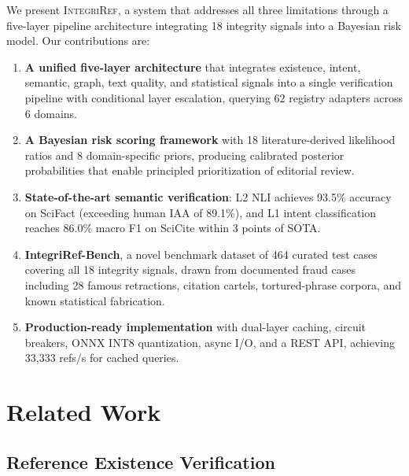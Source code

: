 \documentclass[sigconf,nonacm]{acmart}
\begin{document}
We present \textsc{IntegriRef}, a system that addresses all three limitations through a five-layer pipeline architecture integrating 18 integrity signals into a Bayesian risk model.
Our contributions are:

\begin{enumerate}
    \item \textbf{A unified five-layer architecture} that integrates existence, intent, semantic, graph, text quality, and statistical signals into a single verification pipeline with conditional layer escalation, querying 62 registry adapters across 6 domains.

    \item \textbf{A Bayesian risk scoring framework} with 18 literature-derived likelihood ratios and 8 domain-specific priors, producing calibrated posterior probabilities that enable principled prioritization of editorial review.

    \item \textbf{State-of-the-art semantic verification}: L2 NLI achieves 93.5\% accuracy on SciFact (exceeding human IAA of 89.1\%), and L1 intent classification reaches 86.0\% macro F1 on SciCite within 3 points of SOTA.

    \item \textbf{IntegriRef-Bench}, a novel benchmark dataset of 464 curated test cases covering all 18 integrity signals, drawn from documented fraud cases including 28 famous retractions, citation cartels, tortured-phrase corpora, and known statistical fabrication.

    \item \textbf{Production-ready implementation} with dual-layer caching, circuit breakers, ONNX INT8 quantization, async I/O, and a REST API, achieving 33,333 refs/s for cached queries.
\end{enumerate}

\section{Related Work}
\label{sec:related}

\subsection{Reference Existence Verification}
\end{document}

